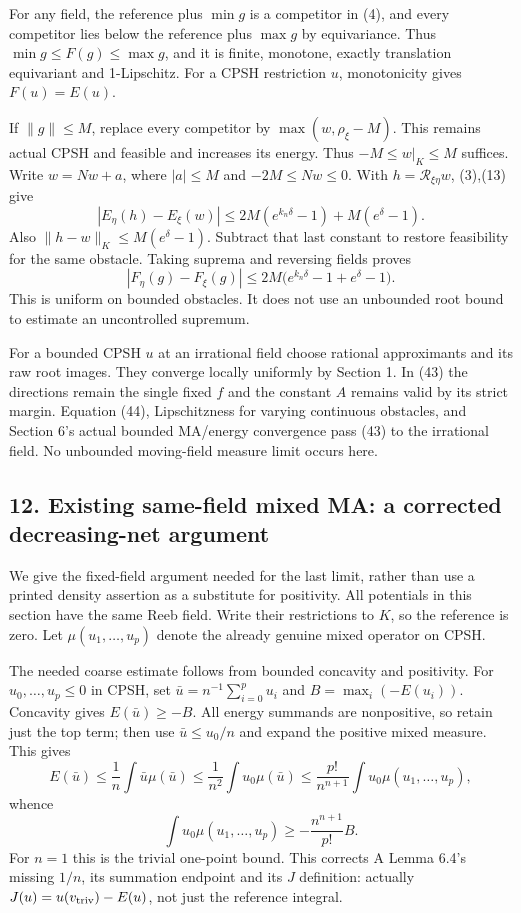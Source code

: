 \documentclass[
  10pt,
]{article}
\begin{document}
For any field, the reference plus \(\min g\) is a competitor in (4), and
every competitor lies below the reference plus \(\max g\) by
equivariance. Thus \(\min g\leq F(g)\leq\max g\), and it is finite,
monotone, exactly translation equivariant and 1-Lipschitz. For a CPSH
restriction \(u\), monotonicity gives \(F(u)=E(u)\).

If \(\|g\|\leq M\), replace every competitor by \(\max(w,\rho_\xi-M)\).
This remains actual CPSH and feasible and increases its energy. Thus
\(-M\leq w|_K\leq M\) suffices. Write \(w=Nw+a\), where \(|a|\leq M\)
and \(-2M\leq Nw\leq0\). With \(h=\mathcal R_{\xi\eta}w\), (3),(13) give
\[ |E_\eta(h)-E_\xi(w)|\leq2M(e^{k_n\delta}-1)+M(e^\delta-1). \] Also
\(\|h-w\|_K\leq M(e^\delta-1)\). Subtract that last constant to restore
feasibility for the same obstacle. Taking suprema and reversing fields
proves
\[ |F_\eta(g)-F_\xi(g)|\leq2M\big(e^{k_n\delta}-1+e^\delta-1\big).                              \tag{44}\]
This is uniform on bounded obstacles. It does not use an unbounded root
bound to estimate an uncontrolled supremum.

For a bounded CPSH \(u\) at an irrational field choose rational
approximants and its raw root images. They converge locally uniformly by
Section 1. In (43) the directions remain the single fixed \(f\) and the
constant \(A\) remains valid by its strict margin. Equation (44),
Lipschitzness for varying continuous obstacles, and Section 6's actual
bounded MA/energy convergence pass (43) to the irrational field. No
unbounded moving-field measure limit occurs here.

\subsection{12. Existing same-field mixed MA: a corrected decreasing-net
argument}\label{existing-same-field-mixed-ma-a-corrected-decreasing-net-argument}

We give the fixed-field argument needed for the last limit, rather than
use a printed density assertion as a substitute for positivity. All
potentials in this section have the same Reeb field. Write their
restrictions to \(K\), so the reference is zero. Let
\(\mu(u_1,\ldots,u_p)\) denote the already genuine mixed operator on
CPSH.

The needed coarse estimate follows from bounded concavity and
positivity. For \(u_0,\ldots,u_p\leq0\) in CPSH, set
\(\bar u=n^{-1}\sum_{i=0}^p u_i\) and \(B=\max_i(-E(u_i))\). Concavity
gives \(E(\bar u)\geq-B\). All energy summands are nonpositive, so
retain just the top term; then use \(\bar u\leq u_0/n\) and expand the
positive mixed measure. This gives \[
 E(\bar u)\leq\frac1n\int\bar u\mu(\bar u)
 \leq\frac1{n^2}\int u_0\mu(\bar u)
 \leq\frac{p!}{n^{n+1}}\int u_0\mu(u_1,\ldots,u_p),
\] whence
\[ \int u_0\mu(u_1,\ldots,u_p)\geq-\frac{n^{n+1}}{p!}B.                                    \tag{45}\]
For \(n=1\) this is the trivial one-point bound. This corrects A Lemma
6.4's missing \(1/n\), its summation endpoint and its \(J\) definition:
actually \(J(u)=u(v_{\rm triv})-E(u)\), not just the reference integral.
\end{document}
